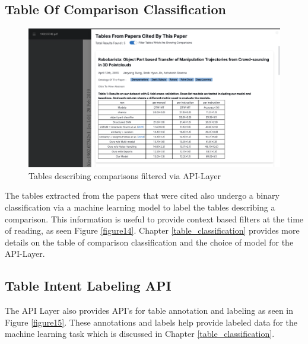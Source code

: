 \subsection{Table Of Comparison Classification}
\begin{figure}[h]
    \centering
    \includegraphics[width=\maxwidth{\textwidth}]{src/images/classification_exp.png}
    \caption{Tables describing comparisons filtered via API-Layer}
    \label{figure\arabic{figurecounter}}
\end{figure}

The tables extracted from the papers that were cited also undergo a binary classification via a machine learning model to label the tables describing a comparison. This information is useful to provide context based filters at the time of reading, as seen Figure \ref{figure14}. Chapter \ref{table_classification} provides more details on the table of comparison classification and the choice of model for the API-Layer.
 
\subsection{Table Intent Labeling API}
The API Layer also provides API's for table annotation and labeling as seen in Figure \ref{figure15}. These annotations and labels help provide labeled data for the machine learning task which is discussed in Chapter \ref{table_classification}.

